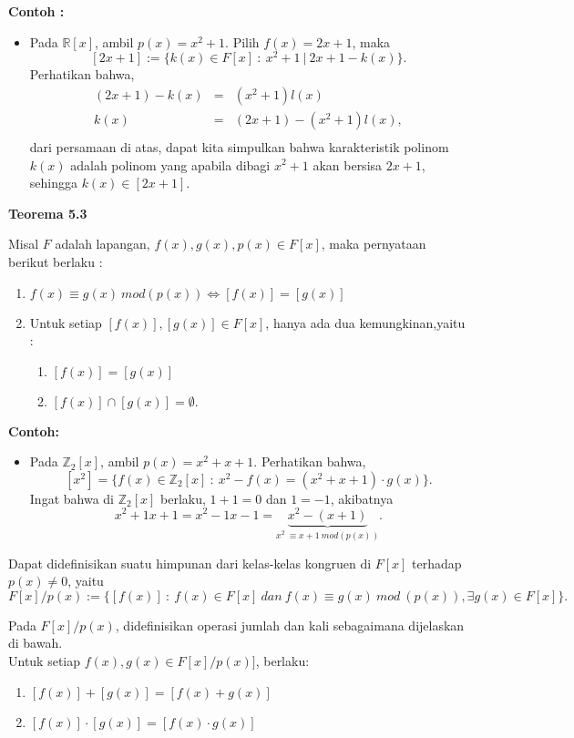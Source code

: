 \par 	\textbf{Contoh :}
	\begin{itemize}
	\item Pada $\mathbb{R}[x]$, ambil $p(x) = x^2 + 1$. Pilih $f(x) = 2x+1$, maka $$[2x+1] := \{ k(x) \in F[x]~:~x^2+1 ~|~2x+1- k(x) \}.$$
	Perhatikan bahwa, 
	$$\begin{array}{lcl}
	(2x+1) - k(x) &=& (x^2+1) l(x)\\
	k(x) &=& (2x + 1) - (x^2+1) l(x),\\
	\end{array}$$
 	dari persamaan di atas, dapat kita simpulkan bahwa karakteristik polinom $k(x)$ adalah polinom yang apabila dibagi $x^2+1$ akan bersisa $2x+1$, sehingga $k(x) \in [2x+1].$
	\end{itemize}
	\textbf{Teorema 5.3}
\par 	Misal $F$ adalah lapangan, $f(x),g(x),p(x) \in F[x]$, maka pernyataan berikut berlaku :
	\begin{enumerate}
	\item $f(x) \equiv g(x)~mod (p(x)) \iff [f(x)]=[g(x)]$
	\item Untuk setiap $[f(x)],[g(x)] \in F[x]$, hanya ada dua kemungkinan,yaitu :
	\begin{enumerate}
		\item $[f(x)] = [g(x)]$
		\item $[f(x)] \cap [g(x)] = \emptyset. $
	\end{enumerate}
	\end{enumerate}
\par	\textbf{Contoh:}
	\begin{itemize}
	\item Pada $\mathbb{Z}_2[x]$, ambil $p(x) = x^2+x+1.$ Perhatikan bahwa, $$[x^2] = \{f(x) \in \mathbb{Z}_2[x]~:~ x^2 - f(x) = (x^2+x+1)\cdot g(x)\}.$$
	Ingat bahwa di $\mathbb{Z}_2[x]$ berlaku, $1+1 = 0$ dan $1=-1$, akibatnya $$x^2+1x+1 = x^2 -1x-1 = \underbrace {x^2 - (x+1)}_{x^2~\equiv x+1~mod(p(x))}.$$
	\end{itemize}
\par 	Dapat didefinisikan suatu himpunan dari kelas-kelas kongruen di $F[x]$ terhadap $p(x) \ne 0$, yaitu $$F[x]/p(x) := \{ [f(x)] ~:~f(x) \in F[x]~dan~f(x) \equiv g(x) ~mod~(p(x)), \exists g(x) \in F[x]\}.$$
\par 	Pada $F[x]/p(x)$, didefinisikan operasi jumlah dan kali sebagaimana dijelaskan di bawah.
\\ 	Untuk setiap $f(x),g(x) \in F[x]/p(x)]$, berlaku:
	\begin{enumerate}
	\item $[f(x)]+[g(x)] = [f(x)+g(x)]$
	\item $[f(x)]\cdot[g(x)] = [f(x)\cdot g(x)]$\\
	\end{enumerate}
